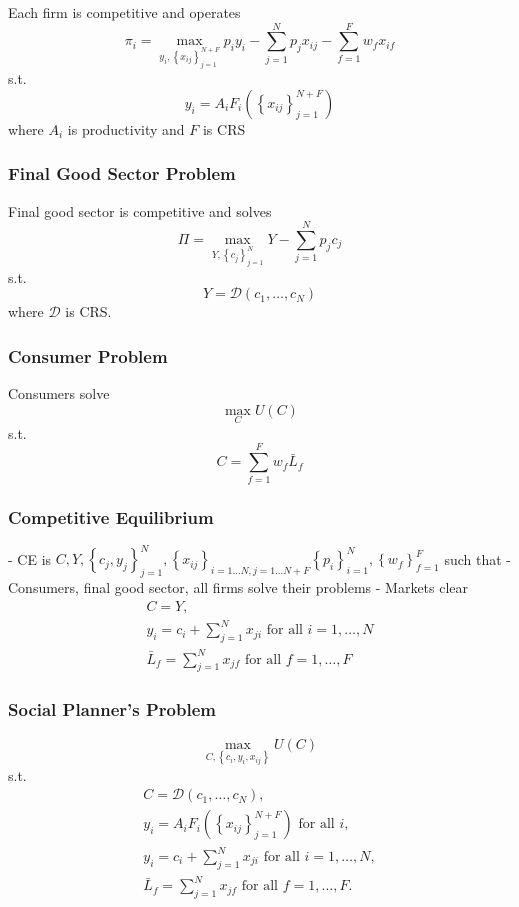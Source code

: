 \documentclass[10pt]{article}
\begin{document}
Each firm is competitive and operates
$$
\pi_i=\max _{y_i,\left\{x_{i j}\right\}_{j=1}^{N+F}} p_i y_i-\sum_{j=1}^N p_j x_{i j}-\sum_{f=1}^F w_f x_{i f}
$$
s.t.
$$
y_i=A_i F_i\left(\left\{x_{i j}\right\}_{j=1}^{N+F}\right)
$$
where $A_i$ is productivity and $F$ is CRS

\subsubsection{Final Good Sector Problem}

Final good sector is competitive and solves
$$
\Pi=\max _{Y,\left\{c_j\right\}_{j=1}^N} Y-\sum_{j=1}^N p_j c_j
$$
s.t.
$$
Y=\mathcal{D}\left(c_1, \ldots, c_N\right)
$$
where $\mathcal{D}$ is CRS.

\subsubsection{Consumer Problem}

Consumers solve
$$
\max _C U(C)
$$
s.t.
$$
C=\sum_{f=1}^F w_f \bar{L}_f
$$

\subsubsection{Competitive Equilibrium}

- CE is $C, Y,\left\{c_j, y_j\right\}_{j=1}^N,\left\{x_{i j}\right\}_{i=1 \ldots N, j=1 \ldots N+F}\left\{p_i\right\}_{i=1}^N,\left\{w_f\right\}_{f=1}^F$ such that
- Consumers, final good sector, all firms solve their problems
- Markets clear
$$
\begin{gathered}
C=Y, \\
y_i=c_i+\sum_{j=1}^N x_{j i} \text { for all } i=1, \ldots, N \\
\bar{L}_f=\sum_{j=1}^N x_{j f} \text { for all } f=1, \ldots, F
\end{gathered}
$$

\subsubsection{Social Planner's Problem}

$$
\max _{C,\left\{c_i, y_i, x_{i j}\right\}} U(C)
$$
s.t.
$$
\begin{gathered}
C=\mathcal{D}\left(c_1, \ldots, c_N\right), \\
y_i=A_i F_i\left(\left\{x_{i j}\right\}_{j=1}^{N+F}\right) \text { for all } i, \\
y_i=c_i+\sum_{j=1}^N x_{j i} \text { for all } i=1, \ldots, N, \\
\bar{L}_f=\sum_{j=1}^N x_{j f} \text { for all } f=1, \ldots, F .
\end{gathered}
$$
\end{document}
